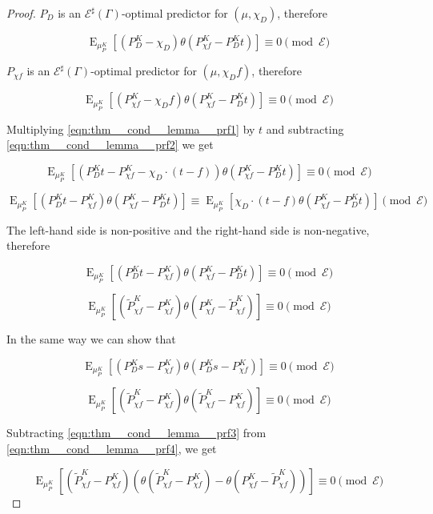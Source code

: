 \documentclass{article}
\numberwithin{equation}{section}
\theoremstyle{definition}
\theoremstyle{plain}
\DeclareMathOperator{\E}{E}
\newcommand{\Fall}{\mathcal{E}}
\newcommand{\ESG}{\Fall^\sharp(\Gamma)}
\begin{document}
\begin{proof}

$P_D$ is an $\ESG$-optimal predictor for $(\mu, \chi_D)$, therefore

\begin{equation}
\label{eqn:thm__cond__lemma__prf1}
\E_{\mu_P^K}[(P_D^K- \chi_D) \theta(P_{\chi f}^K- P_D^K t)] \equiv 0 \pmod \Fall
\end{equation}

$P_{\chi f}$ is an $\ESG$-optimal predictor for $(\mu, \chi_D f)$, therefore

\begin{equation}
\label{eqn:thm__cond__lemma__prf2}
\E_{\mu_P^K}[(P_{\chi f}^K - \chi_D f) \theta(P_{\chi f}^K - P_D^K t)] \equiv 0 \pmod \Fall
\end{equation}

Multiplying \ref{eqn:thm__cond__lemma__prf1} by $t$ and subtracting \ref{eqn:thm__cond__lemma__prf2} we get

\[\E_{\mu_P^K}[(P_D^K t - P_{\chi f}^K - \chi_D \cdot (t - f)) \theta(P_{\chi f}^K- P_D^K t)] \equiv 0 \pmod \Fall\]

\[\E_{\mu_P^K}[(P_D^K t - P_{\chi f}^K ) \theta(P_{\chi f}^K- P_D^K t)] \equiv \E_{\mu_P^K}[\chi_D \cdot (t- f) \theta(P_{\chi f}^K- P_D^K t)] \pmod \Fall\]

The left-hand side is non-positive and the right-hand side is non-negative, therefore

\[\E_{\mu_P^K}[(P_D^K t - P_{\chi f}^K ) \theta(P_{\chi f}^K- P_D^K t)] \equiv 0 \pmod \Fall\]

\begin{equation}
\label{eqn:thm__cond__lemma__prf3}
\E_{\mu_P^K}[(\tilde{P}_{\chi f}^K - P_{\chi f}^K) \theta(P_{\chi f}^K - \tilde{P}_{\chi f}^K)] \equiv 0 \pmod \Fall
\end{equation}

In the same way we can show that

\[\E_{\mu_P^K}[(P_D^K s - P_{\chi f}^K) \theta(P_D^K s-P_{\chi f}^K)] \equiv 0 \pmod \Fall\]

\begin{equation}
\label{eqn:thm__cond__lemma__prf4}
\E_{\mu_P^K}[(\tilde{P}_{\chi f}^K - P_{\chi f}^K) \theta(\tilde{P}_{\chi f}^K-P_{\chi f}^K )] \equiv 0 \pmod \Fall
\end{equation}

Subtracting \ref{eqn:thm__cond__lemma__prf3} from \ref{eqn:thm__cond__lemma__prf4}, we get

\[\E_{\mu_P^K}[(\tilde{P}_{\chi f}^K - P_{\chi f}^K) (\theta(\tilde{P}_{\chi f}^K-P_{\chi f}^K)- \theta(P_{\chi f}^K - \tilde{P}_{\chi f}^K))] \equiv 0 \pmod \Fall\]


\end{proof}
\end{document}
